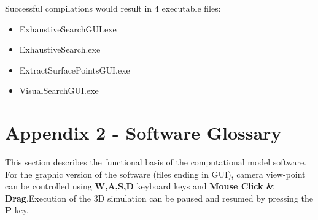 \documentclass[
    a4paper,
    man,
    floatsintext,
    british
]{apa6}
\begin{document}
Successful compilations would result in 4 executable files: 
\begin{itemize}
  \item ExhaustiveSearchGUI.exe 
  \item ExhaustiveSearch.exe
  \item ExtractSurfacePointsGUI.exe  
  \item VisualSearchGUI.exe
\end{itemize}

\section{Appendix 2 - Software Glossary}
This section describes the functional basis of the computational model software. 
For the graphic version of the software (files ending in GUI), camera view-point can be controlled using \textbf{W,A,S,D} keyboard keys and \textbf{Mouse Click \& Drag}.Execution of the 3D simulation can be paused and resumed by pressing the \textbf{P} key.
\end{document}
